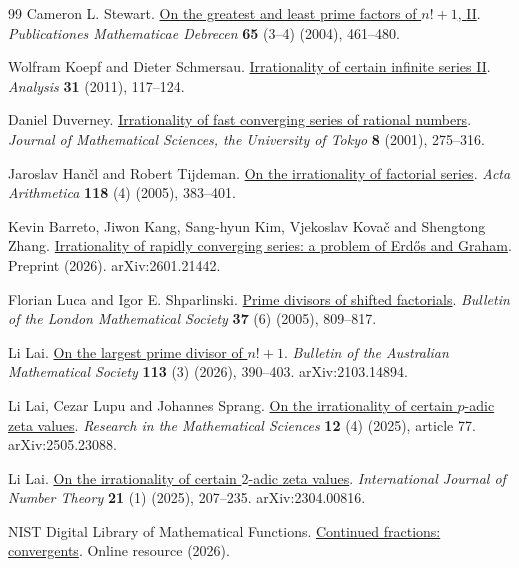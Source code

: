\begin{thebibliography}{99}
Cameron L. Stewart. \href{https://doi.org/10.5486/PMD.2004.3190}{On the greatest and least prime factors of {$n!+1$}, {II}}.
\emph{Publicationes Mathematicae Debrecen} \textbf{65} (3--4) (2004), 461--480.

Wolfram Koepf and Dieter Schmersau. \href{https://doi.org/10.1524/anly.2011.1094}{Irrationality of certain infinite series {II}}.
\emph{Analysis} \textbf{31} (2011), 117--124.

Daniel Duverney. \href{https://www.ms.u-tokyo.ac.jp/journal/pdf/jms080206.pdf}{Irrationality of fast converging series of rational numbers}.
\emph{Journal of Mathematical Sciences, the University of Tokyo} \textbf{8} (2001), 275--316.

Jaroslav Han{\v c}l and Robert Tijdeman. \href{https://doi.org/10.4064/aa118-4-5}{On the irrationality of factorial series}.
\emph{Acta Arithmetica} \textbf{118} (4) (2005), 383--401.

Kevin Barreto, Jiwon Kang, Sang-hyun Kim, Vjekoslav Kova{\v c} and Shengtong Zhang. \href{https://arxiv.org/abs/2601.21442v3}{Irrationality of rapidly converging series: a problem of {Erd{\H o}s} and {Graham}}.
Preprint (2026). arXiv:2601.21442.

Florian Luca and Igor E. Shparlinski. \href{https://doi.org/10.1112/S0024609305004923}{Prime divisors of shifted factorials}.
\emph{Bulletin of the London Mathematical Society} \textbf{37} (6) (2005), 809--817.

Li Lai. \href{https://doi.org/10.1017/S0004972725100543}{On the largest prime divisor of {$n!+1$}}.
\emph{Bulletin of the Australian Mathematical Society} \textbf{113} (3) (2026), 390--403. arXiv:2103.14894.

Li Lai, Cezar Lupu and Johannes Sprang. \href{https://doi.org/10.1007/s40687-025-00559-x}{On the irrationality of certain {$p$}-adic zeta values}.
\emph{Research in the Mathematical Sciences} \textbf{12} (4) (2025), article 77. arXiv:2505.23088.

Li Lai. \href{https://doi.org/10.1142/S1793042125500113}{On the irrationality of certain {$2$}-adic zeta values}.
\emph{International Journal of Number Theory} \textbf{21} (1) (2025), 207--235. arXiv:2304.00816.

{NIST Digital Library of Mathematical Functions}. \href{https://dlmf.nist.gov/1.12}{Continued fractions: convergents}.
Online resource (2026).


\end{thebibliography}
